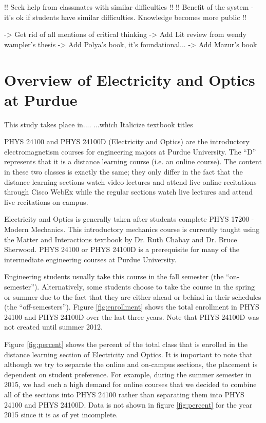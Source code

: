 !! Seek help from classmates with similar difficulties !!
!! Benefit of the system - it's ok if students have similar difficulties. Knowledge becomes more public !!

-> Get rid of all mentions of critical thinking
-> Add Lit review from wendy wampler's thesis
-> Add Polya's book, it's foundational...
-> Add Mazur's book

\section{Overview of Electricity and Optics at Purdue}

This study takes place in.... ...which
Italicize textbook titles

PHYS 24100 and PHYS 24100D (Electricity and Optics) are the introductory electromagnetism courses for engineering majors at Purdue University. The ``D'' represents that it is a distance learning course (i.e. an online course). The content in these two classes is exactly the same; they only differ in the fact that the distance learning sections watch video lectures and attend live online recitations through Cisco WebEx while the regular sections watch live lectures and attend live recitations on campus.

Electricity and Optics is generally taken after students complete PHYS 17200 - Modern Mechanics. This introductory mechanics course is currently taught using the Matter and Interactions textbook by Dr. Ruth Chabay and Dr. Bruce Sherwood\cite{chabay2010}. PHYS 24100 or PHYS 24100D is a prerequisite for many of the intermediate engineering courses at Purdue University.

Engineering students usually take this course in the fall semester (the ``on-semester''). Alternatively, some students choose to take the course in the spring or summer due to the fact that they are either ahead or behind in their schedules (the ``off-semesters''). Figure \ref{fig:enrollment} shows the total enrollment in PHYS 24100 and PHYS 24100D over the last three years. Note that PHYS 24100D was not created until summer 2012.

Figure \ref{fig:percent} shows the percent of the total class that is enrolled in the distance learning section of Electricity and Optics. It is important to note that although we try to separate the online and on-campus sections, the placement is dependent on student preference. For example, during the summer semester in 2015, we had such a high demand for online courses that we decided to combine all of the sections into PHYS 24100 rather than separating them into PHYS 24100 and PHYS 24100D. Data is not shown in figure \ref{fig:percent} for the year 2015 since it is as of yet incomplete.

